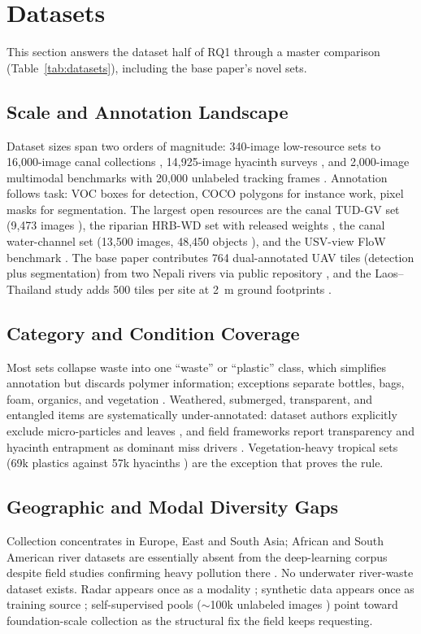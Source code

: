 \section{Datasets}
\label{sec:datasets}

This section answers the dataset half of RQ1 through a master comparison (Table~\ref{tab:datasets}), including the base paper's novel sets.

\subsection{Scale and Annotation Landscape}
Dataset sizes span two orders of magnitude: 340-image low-resource sets \cite{Putra2021} to 16,000-image canal collections \cite{Qiao2022}, 14,925-image hyacinth surveys \cite{Saigon2025}, and 2,000-image multimodal benchmarks with 20,000 unlabeled tracking frames \cite{Cheng2021}. Annotation follows task: VOC boxes for detection, COCO polygons for instance work, pixel masks for segmentation. The largest open resources are the canal TUD-GV set (9,473 images \cite{JiaFrontiers2023}), the riparian HRB-WD set with released weights \cite{Pan2024}, the canal water-channel set (13,500 images, 48,450 objects \cite{Tharani2021}), and the USV-view FloW benchmark \cite{Cheng2021}. The base paper contributes 764 dual-annotated UAV tiles (detection plus segmentation) from two Nepali rivers via public repository \cite{Pati2025}, and the Laos--Thailand study adds 500 tiles per site at 2~m ground footprints \cite{Maharjan2022}.

\subsection{Category and Condition Coverage}
Most sets collapse waste into one ``waste'' or ``plastic'' class, which simplifies annotation but discards polymer information; exceptions separate bottles, bags, foam, organics, and vegetation \cite{Lin2021,Nunkhaw2024,Tharani2021}. Weathered, submerged, transparent, and entangled items are systematically under-annotated: dataset authors explicitly exclude micro-particles and leaves \cite{Tharani2021}, and field frameworks report transparency and hyacinth entrapment as dominant miss drivers \cite{JiaFlux2025,Nunkhaw2025}. Vegetation-heavy tropical sets (69k plastics against 57k hyacinths \cite{Saigon2025}) are the exception that proves the rule.

\subsection{Geographic and Modal Diversity Gaps}
Collection concentrates in Europe, East and South Asia; African and South American river datasets are essentially absent from the deep-learning corpus despite field studies confirming heavy pollution there \cite{Atuhaire2025}. No underwater river-waste dataset exists. Radar appears once as a modality \cite{Cheng2021}; synthetic data appears once as training source \cite{Pan2023}; self-supervised pools ($\sim$100k unlabeled images \cite{JiaSwAV2024}) point toward foundation-scale collection as the structural fix the field keeps requesting.

